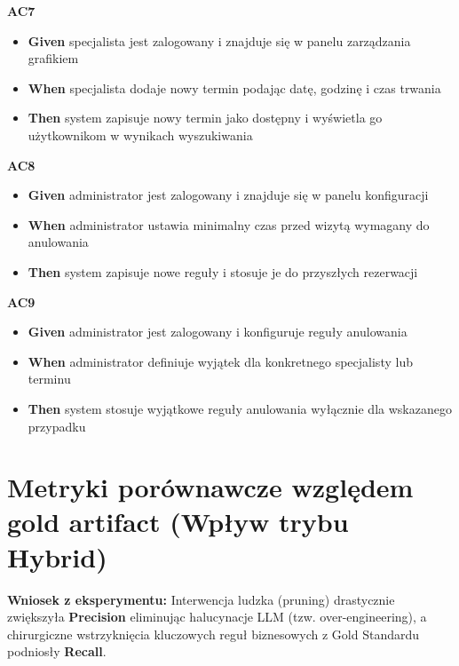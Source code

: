 \documentclass[12pt,a4paper]{article}
\begin{document}
\vspace{0.4em}
\textbf{AC7}
\begin{itemize}[itemsep=2pt]
  \item \textbf{Given} specjalista jest zalogowany i znajduje się w panelu zarządzania grafikiem
  \item \textbf{When} specjalista dodaje nowy termin podając datę, godzinę i czas trwania
  \item \textbf{Then} system zapisuje nowy termin jako dostępny i wyświetla go użytkownikom w wynikach wyszukiwania
\end{itemize}

\vspace{0.4em}
\textbf{AC8}
\begin{itemize}[itemsep=2pt]
  \item \textbf{Given} administrator jest zalogowany i znajduje się w panelu konfiguracji
  \item \textbf{When} administrator ustawia minimalny czas przed wizytą wymagany do anulowania
  \item \textbf{Then} system zapisuje nowe reguły i stosuje je do przyszłych rezerwacji
\end{itemize}

\vspace{0.4em}
\textbf{AC9}
\begin{itemize}[itemsep=2pt]
  \item \textbf{Given} administrator jest zalogowany i konfiguruje reguły anulowania
  \item \textbf{When} administrator definiuje wyjątek dla konkretnego specjalisty lub terminu
  \item \textbf{Then} system stosuje wyjątkowe reguły anulowania wyłącznie dla wskazanego przypadku
\end{itemize}

\newpage

\section{Metryki porównawcze względem gold artifact (Wpływ trybu Hybrid)}

\begin{mdframed}[backgroundcolor=metabg, linewidth=0pt, innerleftmargin=10pt, innerrightmargin=10pt, innertopmargin=8pt, innerbottommargin=8pt]
\small
\textbf{Wniosek z eksperymentu:} Interwencja ludzka (pruning) drastycznie zwiększyła \textbf{Precision} eliminując halucynacje LLM (tzw. over-engineering), a chirurgiczne wstrzyknięcia kluczowych reguł biznesowych z Gold Standardu podniosły \textbf{Recall}.
\end{mdframed}
\end{document}
